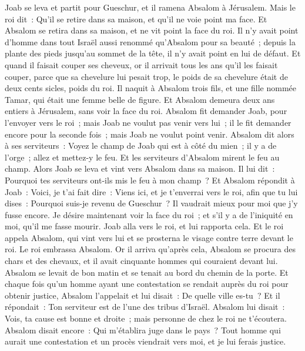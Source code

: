 \begin{multicols}{2}
Joab se leva et partit pour Gueschur, et il ramena Absalom à Jérusalem.
Mais le roi dit~: Qu'il se retire dans sa maison, et qu'il ne voie point ma face. Et Absalom se retira dans sa maison, et ne vit point la face du roi.
Il n'y avait point d'homme dans tout Israël aussi renommé qu'Absalom pour sa beauté~; depuis la plante des pieds jusqu'au sommet de la tête, il n'y avait point en lui de défaut.
Et quand il faisait couper ses cheveux, or il arrivait tous les ans qu'il les faisait couper, parce que sa chevelure lui pesait trop, le poids de sa chevelure était de deux cents sicles, poids du roi.
Il naquit à Absalom trois fils, et une fille nommée Tamar, qui était une femme belle de figure.
Et Absalom demeura deux ans entiers à Jérusalem, sans voir la face du roi.
Absalom fit demander Joab, pour l'envoyer vers le roi~; mais Joab ne voulut pas venir vers lui~; il le fit demander encore pour la seconde fois~; mais Joab ne voulut point venir.
Absalom dit alors à ses serviteurs~: Voyez le champ de Joab qui est à côté du mien~; il y a de l'orge~; allez et mettez-y le feu. Et les serviteurs d'Absalom mirent le feu au champ.
Alors Joab se leva et vint vers Absalom dans sa maison. Il lui dit~: Pourquoi tes serviteurs ont-ils mis le feu à mon champ~?
Et Absalom répondit à Joab~: Voici, je t'ai fait dire~: Viens ici, et je t'enverrai vers le roi, afin que tu lui dises~: Pourquoi suis-je revenu de Gueschur~? Il vaudrait mieux pour moi que j'y fusse encore. Je désire maintenant voir la face du roi~; et s'il y a de l'iniquité en moi, qu'il me fasse mourir.
Joab alla vers le roi, et lui rapporta cela. Et le roi appela Absalom, qui vint vers lui et se prosterna le visage contre terre devant le roi. Le roi embrassa Absalom.
\VerseOne{}Or il arriva qu'après cela, Absalom se procura des chars et des chevaux, et il avait cinquante hommes qui couraient devant lui.
Absalom se levait de bon matin et se tenait au bord du chemin de la porte. Et chaque fois qu'un homme ayant une contestation se rendait auprès du roi pour obtenir justice, Absalom l'appelait et lui disait~: De quelle ville es-tu~? Et il répondait~: Ton serviteur est de l'une des tribus d'Israël.
Absalom lui disait~: Vois, ta cause est bonne et droite~; mais personne de chez le roi ne t'écoutera.
Absalom disait encore~: Qui m'établira juge dans le pays~? Tout homme qui aurait une contestation et un procès viendrait vers moi, et je lui ferais justice.

\end{multicols}
